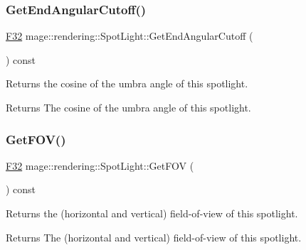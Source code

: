 \subsubsection{\texorpdfstring{Get\+End\+Angular\+Cutoff()}{GetEndAngularCutoff()}}
{\footnotesize\ttfamily \hyperlink{namespacemage_aa97e833b45f06d60a0a9c4fc22ae02c0}{F32} mage\+::rendering\+::\+Spot\+Light\+::\+Get\+End\+Angular\+Cutoff (\begin{DoxyParamCaption}{ }\end{DoxyParamCaption}) const\hspace{0.3cm}{\ttfamily [noexcept]}}

Returns the cosine of the umbra angle of this spotlight.

\begin{DoxyReturn}{Returns}
The cosine of the umbra angle of this spotlight. 
\end{DoxyReturn}
\hypertarget{classmage_1_1rendering_1_1_spot_light_a22527d940bc7601285429b36e8d97490}{}\label{classmage_1_1rendering_1_1_spot_light_a22527d940bc7601285429b36e8d97490} 
\subsubsection{\texorpdfstring{Get\+F\+O\+V()}{GetFOV()}}
{\footnotesize\ttfamily \hyperlink{namespacemage_aa97e833b45f06d60a0a9c4fc22ae02c0}{F32} mage\+::rendering\+::\+Spot\+Light\+::\+Get\+F\+OV (\begin{DoxyParamCaption}{ }\end{DoxyParamCaption}) const\hspace{0.3cm}{\ttfamily [noexcept]}}

Returns the (horizontal and vertical) field-\/of-\/view of this spotlight.

\begin{DoxyReturn}{Returns}
The (horizontal and vertical) field-\/of-\/view of this spotlight. 
\end{DoxyReturn}
\hypertarget{classmage_1_1rendering_1_1_spot_light_ac3fe64c6d599149cf569693f74ac41e8}{}\label{classmage_1_1rendering_1_1_spot_light_ac3fe64c6d599149cf569693f74ac41e8} 
